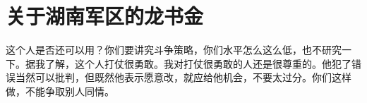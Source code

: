 \section[关于湖南军区的龙书金（一九六七年七月）]{关于湖南军区的龙书金}


这个人是否还可以用？你们要讲究斗争策略，你们水平怎么这么低，也不研究一下。据我了解，这个人打仗很勇敢。我对打仗很勇敢的人还是很尊重的。他犯了错误当然可以批判，但既然他表示愿意改，就应给他机会，不要太过分。你们这样做，不能争取别人同情。

